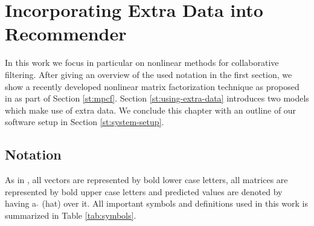 \chapter{Incorporating Extra Data into Recommender}
\label{c:incorporating-extra-data}


\newcommand{\norm}[1]{\ensuremath{\lVert{#1}\rVert}}
\newcommand{\Abf}[1]{\ensuremath{\mathbf{#1}}}

In this work we focus in particular on nonlinear methods for collaborative filtering.
After giving an overview of the used notation in the first section, we show a recently developed nonlinear matrix factorization technique as proposed in \cite{Kabbur2015} as part of Section \ref{st:mpcf}.
Section \ref{st:using-extra-data} introduces two models which make use of extra data.
We conclude this chapter with an outline of our software setup in Section \ref{st:system-setup}.

\section{Notation}
\label{st:notation}

As in \cite{Kabbur2015}, all vectors are represented by bold lower case letters, all matrices are represented by bold upper case letters and predicted values are denoted by having a $\hat{}$ (hat) over it.
All important symbols and definitions used in this work is summarized in Table \ref{tab:symbols}.

